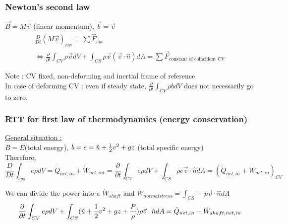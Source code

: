 \documentclass[../main.tex]{subfiles}
\begin{document}
\subsubsection{Newton's second law}
$\Vec{B} = M\Vec{v}$ (linear momentum), $\Vec{b} = \vec{v}$\\

\begin{equation}
    \begin{gathered}
        \frac{D}{Dt}(M\Vec{v})_{sys} = \sum \Vec{F}_{sys}\\
       \Leftrightarrow \frac{\partial}{\partial t} \int_{CV} \rho \Vec{v}dV + \int_{CS} \rho \Vec{v} (\Vec{v}\cdot \hat{n})dA = \sum \Vec{F}_{\text{constant of coincident CV}}
    \end{gathered}
\end{equation}

\color{gray} Note : CV fixed, non-deforming and inertial frame of reference\\
In case of deforming CV : even if steady state, $\frac{\partial}{\partial t} \int_{CV} \rho b dV$ does not necessarily go to zero.\color{black}\\

\subsubsection{RTT for first law of thermodynamics (energy conservation)}
\quad \underline{General situation :}\\
$B = E$(total energy), $b = e = \Tilde{u}+\frac{1}{2}v^2 + gz$ (total specific energy)\\

Therefore, \\
\begin{equation}
    \frac{D}{Dt}\int_{sys} e\rho dV = \dot{Q}_{net,in}+\dot{W}_{net,int} = \frac{\partial}{\partial t}\int_{CV}e\rho dV + \int_{CS}\rho e \Vec{v}\cdot \hat{n}dA = (\dot{Q}_{net,in}+\dot{W}_{net,in})_{CV}
\end{equation}

We can divide the power into a $\dot{W}_{shaft}$ and $\dot{W}_{normal stress} = \int_{CS}-p\Vec{v}\cdot \hat{n}dA$\\

\begin{equation}
    \frac{\partial }{\partial t} \int_{CV} e\rho dV + \int_{CS} (\Tilde{u}+\frac{1}{2}v^2+gz+\frac{P}{\rho}) \rho \Vec{v}\cdot \hat{n}dA = \dot{Q}_{net,in}+\dot{W}_{shaft,net,in}
\end{equation}
\end{document}
